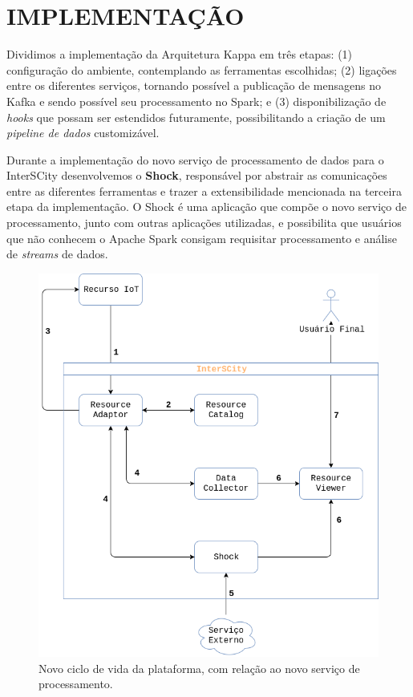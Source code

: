 \section{IMPLEMENTAÇÃO}

Dividimos a implementação da Arquitetura Kappa em três etapas:
(1) configuração do ambiente, contemplando as ferramentas escolhidas;
(2) ligações entre os diferentes serviços, tornando possível a publicação de
    mensagens no Kafka e sendo possível seu processamento no Spark; e
(3) disponibilização de \textit{hooks} que possam ser estendidos futuramente,
    possibilitando a criação de um \textit{pipeline de dados} customizável.

Durante a implementação do novo serviço de processamento de dados para o
InterSCity desenvolvemos o \textbf{Shock}, responsável por abstrair as
comunicações entre as diferentes ferramentas e trazer a extensibilidade mencionada
na terceira etapa da implementação. O Shock é uma aplicação que compõe o
novo serviço de processamento, junto com outras aplicações utilizadas, e
possibilita que usuários que não conhecem o Apache Spark consigam requisitar
processamento e análise de \textit{streams} de dados.

\begin{figure}[hbt]
  \centering
    \includegraphics[scale=0.45]{figuras/shock_usage.png}
    \caption{Novo ciclo de vida da plataforma, com relação ao novo serviço de processamento.}
  \label{fig:shock_usage}
\end{figure}

